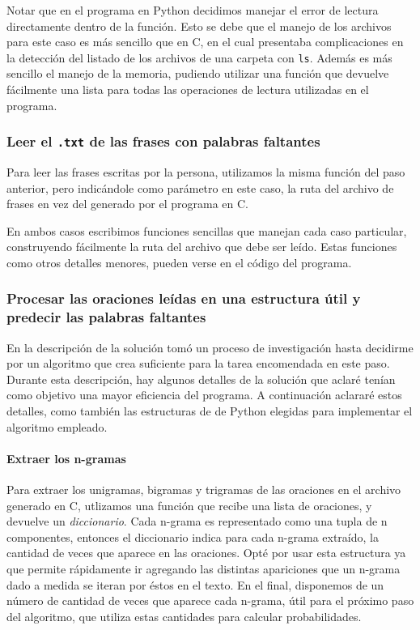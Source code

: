 \documentclass[a4paper]{article}
\begin{document}
Notar que en el programa en Python decidimos manejar el error de lectura directamente dentro de la función. Esto se debe que el manejo de los archivos para este caso es más sencillo que en C, en el cual presentaba complicaciones en la detección del listado de los archivos de una carpeta con \texttt{ls}. Además es más sencillo el manejo de la memoria, pudiendo utilizar una función que devuelve fácilmente una lista para todas las operaciones de lectura utilizadas en el programa.

\subsubsection{Leer el \texttt{.txt} de las frases con palabras faltantes}

Para leer las frases escritas por la persona, utilizamos la misma función del paso anterior, pero indicándole como parámetro en este caso, la ruta del archivo de frases en vez del generado por el programa en C.

En ambos casos escribimos funciones sencillas que manejan cada caso particular, construyendo fácilmente la ruta del archivo que debe ser leído. Estas funciones como otros detalles menores, pueden verse en el código del programa.

\subsubsection{Procesar las oraciones leídas en una estructura útil y predecir las palabras faltantes}

En la descripción de la solución tomó un proceso de investigación hasta decidirme por un algoritmo que crea suficiente para la tarea encomendada en este paso. Durante esta descripción, hay algunos detalles de la solución que aclaré tenían como objetivo una mayor eficiencia del programa. A continuación aclararé estos detalles, como también las estructuras de de Python elegidas para implementar el algoritmo empleado.

\paragraph{Extraer los n-gramas}

Para extraer los unigramas, bigramas y trigramas de las oraciones en el archivo generado en C, utlizamos una función que recibe una lista de oraciones, y devuelve un \textit{diccionario}. Cada n-grama es representado como una tupla de n componentes, entonces el diccionario indica para cada n-grama extraído, la cantidad de veces que aparece en las oraciones. Opté por usar esta estructura ya que permite rápidamente ir agregando las distintas apariciones que un n-grama dado a medida se iteran por éstos en el texto. En el final, disponemos de un número de cantidad de veces que aparece cada n-grama, útil para el próximo paso del algoritmo, que utiliza estas cantidades para calcular probabilidades.
\end{document}
